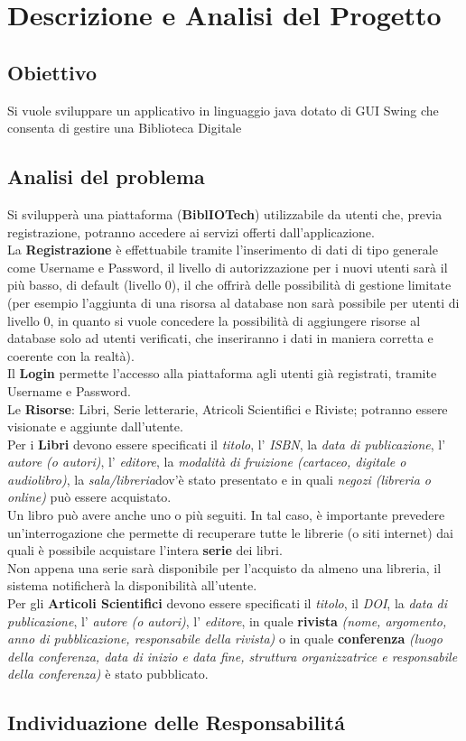 \chapter{Descrizione e Analisi del Progetto}
\section{Obiettivo}
Si vuole sviluppare un applicativo in linguaggio java dotato di GUI Swing che consenta di gestire una Biblioteca Digitale
\section{Analisi del problema}
Si svilupperà una piattaforma (\textbf{BiblIOTech}) utilizzabile da utenti che, previa registrazione, potranno accedere ai servizi offerti dall'applicazione.
\\ \indent La \textbf{Registrazione} è effettuabile tramite l'inserimento di dati di tipo generale come Username e Password, il livello di autorizzazione per i nuovi utenti sarà il più basso, di default (livello 0), il che offrirà delle possibilità di gestione limitate (per esempio l'aggiunta di una risorsa al database non sarà possibile per utenti di livello 0, in quanto si vuole concedere la possibilità di aggiungere risorse al database solo ad utenti verificati, che inseriranno i dati in maniera corretta e coerente con la realtà).
\\ \indent Il \textbf{Login} permette l'accesso alla piattaforma agli utenti già registrati, tramite Username e Password.
\\ \indent Le \textbf{Risorse}: Libri, Serie letterarie, Atricoli Scientifici e Riviste; potranno essere visionate e aggiunte dall'utente.
\\ \indent Per i \textbf{Libri} devono essere specificati il \emph{titolo}, l' \emph{ISBN}, la \emph{data di publicazione}, l' \emph{autore (o autori)}, l' \emph{editore}, la \emph{modalità di fruizione (cartaceo, digitale o audiolibro)}, la \emph{sala/libreria}dov'è stato presentato e in quali \emph{negozi (libreria o online)} può essere acquistato.\\ Un libro può avere anche uno o più seguiti. In tal caso, è importante prevedere un’interrogazione che permette di recuperare tutte le librerie (o siti internet) dai quali è possibile acquistare l’intera \textbf{serie} dei libri.\\ Non appena una serie sarà disponibile per l’acquisto da almeno una libreria, il sistema notificherà la disponibilità all’utente.
\\ \indent Per gli \textbf{Articoli Scientifici} devono essere specificati il \emph{titolo}, il \emph{DOI}, la \emph{data di publicazione}, l' \emph{autore (o autori)}, l' \emph{editore}, in quale \textbf{rivista} \emph{(nome, argomento, anno di pubblicazione, responsabile della rivista)} o in quale \textbf{conferenza} \emph{(luogo della conferenza, data di inizio e data fine, struttura organizzatrice e responsabile della conferenza)} è stato pubblicato.
\section{Individuazione delle Responsabilit\'a}